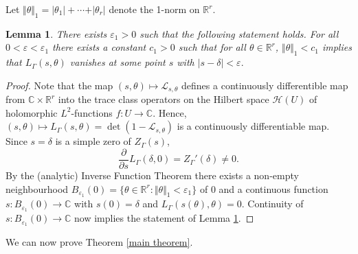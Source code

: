 \documentclass[12pt]{article}
\newtheorem{lem}[thm]{Lemma}
\newcommand{\RR}{\mathbb{R}}
\newcommand{\CC}{\mathbb{C}}
\begin{document}
Let $ \Vert \theta\Vert_{1} = \vert \theta_{1}\vert + \cdots + \vert \theta_{r}\vert $ denote the 1-norm on $ \RR^{r}. $

\begin{lem}\label{vanishing property}
There exists $ \varepsilon_{1}>0 $ such that the following statement holds.
For all $ 0 <  \varepsilon < \varepsilon_{1} $ there exists a constant $ c_{1}>0 $ such that for all $ \theta\in \RR^{r} $, $ \Vert \theta\Vert_{1} < c_{1} $ implies that $ L_{\Gamma}(s,\theta) $ vanishes at some point $ s $ with $ \vert s-\delta\vert < \varepsilon. $
\end{lem}

\begin{proof}
Note that the map $ (s,\theta)\mapsto \mathcal{L}_{s, \theta} $ defines a continuously differentible map from $ \CC\times\RR^{r} $ into the trace class operators on the Hilbert space $ \mathcal{H}(U) $ of holomorphic $ L^{2} $-functions $ f:U\to \CC $. Hence, $ (s,\theta)\mapsto L_{\Gamma}(s,\theta)=\det(1-\mathcal{L}_{s, \theta}) $ is a continuously differentiable map. Since $ s = \delta $ is a simple zero of $ Z_{\Gamma}(s) $, 
$$ \frac{\partial}{\partial s} L_{\Gamma}(\delta, 0) = Z_{\Gamma}'(\delta) \neq 0. $$
By the (analytic) Inverse Function Theorem there exists a non-empty neighbourhood $ B_{\varepsilon_{1}}(0)=\{\theta\in \RR^{r} : \Vert \theta\Vert_{1} < \varepsilon_{1} \} $ of $ 0 $ and a continuous function $ s : B_{\varepsilon_{1}}(0)\to \CC $ with $ s(0) = \delta $ and $ L_{\Gamma}(s(\theta), \theta) = 0. $ Continuity of $ s :  B_{\varepsilon_{1}}(0)\to \CC $ now implies the statement of Lemma \ref{vanishing property}. 
\end{proof}

We can now prove Theorem \ref{main theorem}.
\end{document}
